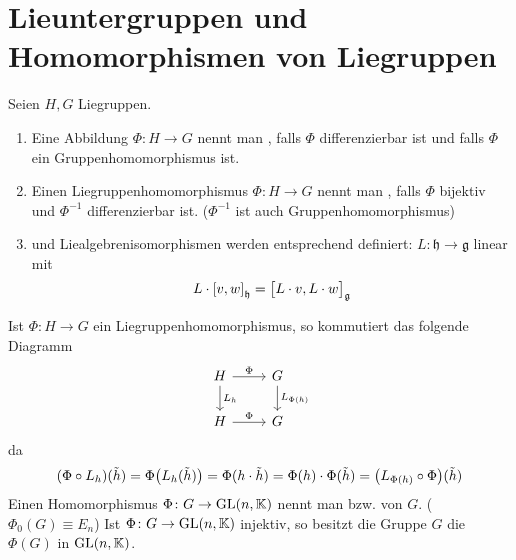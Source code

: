 \section{Lieuntergruppen und Homomorphismen von Liegruppen} %
\label{sec:12}

\begin{definition}[{name=[Liegruppen- und Liealgebrenhomomorphismen]}]
	Seien $H,G$ Liegruppen.
	\begin{enumerate}[1)]
		\item Eine Abbildung $\Phi \colon H \to G$ nennt man , falls $\Phi$ differenzierbar ist und falls $\Phi$ ein Gruppenhomomorphismus ist.
		\item Einen Liegruppenhomomorphismus $\Phi \colon H \to G$ nennt man , falls $\Phi$ bijektiv und $\Phi^{-1}$ differenzierbar ist. ($\Phi^{-1}$ ist auch Gruppenhomomorphismus)
		\item {} und Liealgebrenisomorphismen werden entsprechend definiert:  $L \colon \mathfrak{h} \to \mathfrak{g}$ linear mit
		\[
			L \cdot \benbrace*{v,w}_{\mathfrak{h}} = \benbrace[\big]{L \cdot v, L \cdot w}_\mathfrak{g}
		\]
	\end{enumerate}
\end{definition}

Ist $\Phi \colon H \to G$ ein Liegruppenhomomorphismus, so kommutiert das folgende Diagramm
\[
	\begin{tikzcd}
		H \rar["\Phi"] \dar["L_h"] & G \dar["L_{\Phi(h)}"] \\
		H \rar["\Phi"] & G
	\end{tikzcd}
\]
da
\begin{align}
	(\Phi \circ L_h)(\tilde{h}) = \Phi \enbrace*{L_h(\tilde{h})} = \Phi(h \cdot \tilde{h}) = \Phi(h) \cdot \Phi(\tilde{h}) = \enbrace*{L_{\Phi(h)} \circ \Phi}(\tilde{h})
\end{align}
Einen Homomorphismus $\Phi \colon G \to \GL(n,\mathbb{K})$ nennt man  bzw.  von $G$. ($\Phi_0(G)\equiv E_n$)
Ist $\Phi \colon G \to \GL(n,\mathbb{K})$ injektiv, so besitzt die Gruppe $G$ die  $\Phi(G)$ in $\GL(n,\mathbb{K})$.

